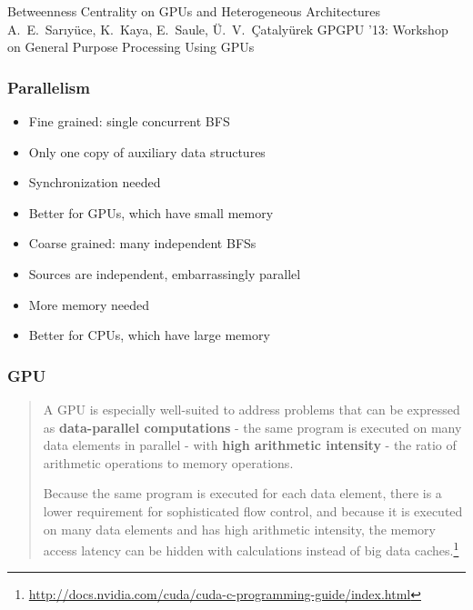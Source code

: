 \begin{frame}
  \centering
  \vfill
  {\huge Betweenness Centrality on GPUs and Heterogeneous Architectures}
  \vfill
  {\Large A.~E.~Sar\i y\"uce, K.~Kaya, E.~Saule, \"U.~V.~\c{C}ataly\"urek}
  \vfill
  {\large GPGPU '13: Workshop on General Purpose Processing Using GPUs}
  \vfill
\end{frame}

\begin{frame}
  \frametitle{Parallelism}

  \begin{itemize}
    \item Fine grained: single concurrent BFS
    \item Only one copy of auxiliary data structures
    \item Synchronization needed
    \item Better for GPUs, which have small memory
  \end{itemize}
  \begin{itemize}
    \item Coarse grained: many independent BFSs
    \item Sources are independent, embarrassingly parallel
    \item More memory needed
    \item Better for CPUs, which have large memory
  \end{itemize}
\end{frame}

\begin{frame}
  \frametitle{GPU}

  \begin{quote}
    A GPU is especially well-suited to address problems that can be expressed as \textbf{data-parallel computations} - the same program is executed on many data elements in parallel - with \textbf{high arithmetic intensity} - the ratio of arithmetic operations to memory operations.

    Because the same program is executed for each data element, there is a lower requirement for sophisticated flow control, and because it is executed on many data elements and has high arithmetic intensity, the memory access latency can be hidden with calculations instead of big data caches.\footnote{\url{http://docs.nvidia.com/cuda/cuda-c-programming-guide/index.html}}
  \end{quote}
\end{frame}


